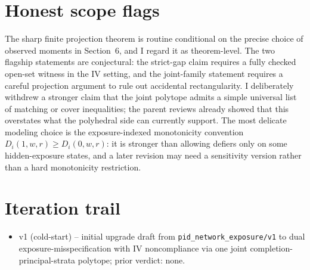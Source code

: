 \documentclass[11pt]{article}
\theoremstyle{definition}
\theoremstyle{plain}
\theoremstyle{remark}
\begin{document}
\section{Honest scope flags}
The sharp finite projection theorem is routine conditional on the precise choice of observed moments in Section~6, and I regard it as theorem-level. The two flagship statements are conjectural: the strict-gap claim requires a fully checked open-set witness in the IV setting, and the joint-family statement requires a careful projection argument to rule out accidental rectangularity. I deliberately withdrew a stronger claim that the joint polytope admits a simple universal list of matching or cover inequalities; the parent reviews already showed that this overstates what the polyhedral side can currently support. The most delicate modeling choice is the exposure-indexed monotonicity convention \(D_i(1,w,r)\ge D_i(0,w,r)\): it is stronger than allowing defiers only on some hidden-exposure states, and a later revision may need a sensitivity version rather than a hard monotonicity restriction.

\section{Iteration trail}
\begin{itemize}[leftmargin=*]
\item v1 (cold-start) -- initial upgrade draft from \texttt{pid\_network\_exposure/v1} to dual exposure-misspecification with IV noncompliance via one joint completion-principal-strata polytope; prior verdict: none.
\end{itemize}
\end{document}
